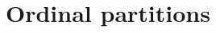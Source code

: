 
\renewcommand{\chapterlabel}{Chapter}
\chapter{Ordinal partitions}
\label{chap:ordinal_partitions}

